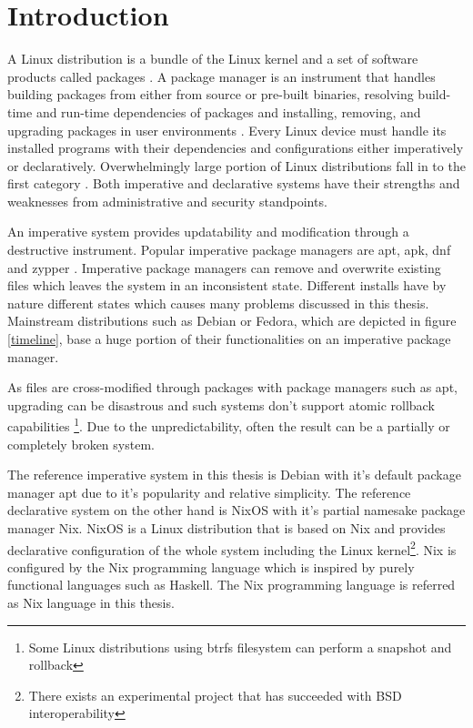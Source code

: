 \chapter{Introduction} \label{johdanto}


A Linux distribution is a bundle of the Linux kernel and a set of software products called packages \cite{gnuPackagesx2014}. A package manager is an instrument that handles building packages from either from source or pre-built binaries, resolving build-time and run-time dependencies of packages and installing, removing, and upgrading packages in user environments \cite{gnuPackagesx2014}. Every Linux device must handle its installed programs with their dependencies and configurations either imperatively or declaratively. Overwhelmingly large portion of Linux distributions fall in to the first category \cite{dolstra2008nixos}. Both imperative and declarative systems have their strengths and weaknesses from administrative and security standpoints.

An imperative system provides updatability and modification through a destructive instrument. Popular imperative package managers are apt, apk, dnf and zypper \cite{dolstra2008nixos}. Imperative package managers can remove and overwrite existing files which leaves the system in an inconsistent state. Different installs have by nature different states which causes many problems discussed in this thesis. Mainstream distributions such as Debian or Fedora, which are depicted in figure \ref{timeline}, base a huge portion of their functionalities on an imperative package manager.

As files are cross-modified through packages with package managers such as apt, upgrading can be disastrous and such systems don't support atomic rollback capabilities \footnote{Some Linux distributions using btrfs filesystem can perform a snapshot and rollback\cite{opensuseSystemRecovery}}. Due to the unpredictability, often the result can be a partially or completely broken system. \cite{dolstra2008nixos}

The reference imperative system in this thesis is Debian with it's default package manager apt due to it's popularity and relative simplicity. The reference declarative system on the other hand is NixOS with it's partial namesake package manager Nix. NixOS is a Linux distribution that is based on Nix and provides declarative configuration of the whole system including the Linux kernel\footnote{There exists an experimental project that has succeeded with BSD interoperability}. Nix is configured by the Nix programming language which is inspired by purely functional languages such as Haskell. The Nix programming language is referred as Nix language in this thesis. \cite{van2013reference}

